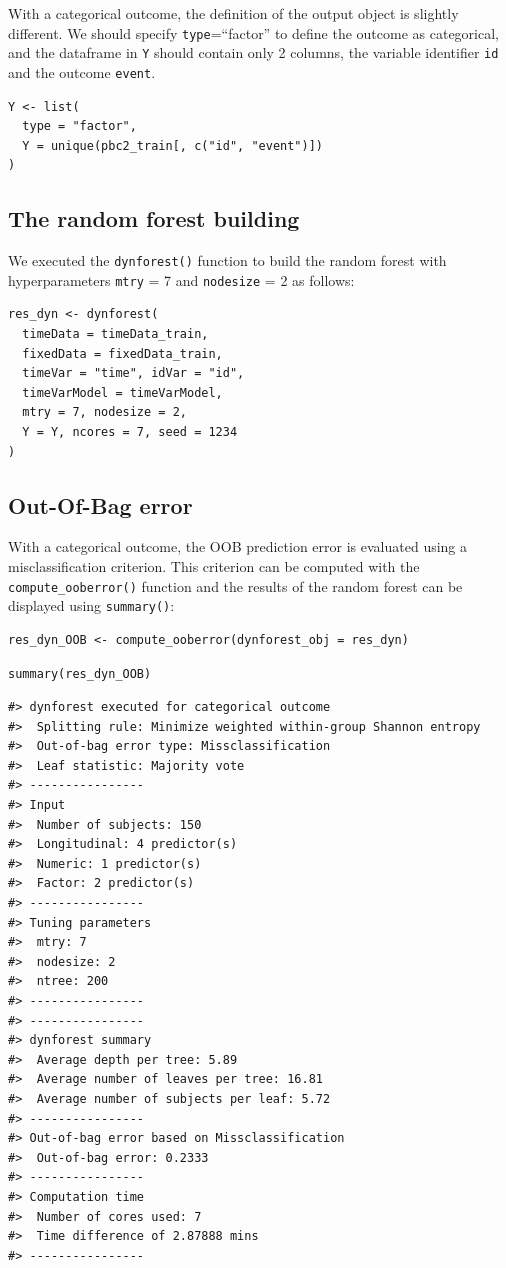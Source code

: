 With a categorical outcome, the definition of the output object is slightly different. We should specify \texttt{type}=``factor'' to define the outcome as categorical, and the dataframe in \texttt{Y} should contain only 2 columns, the variable identifier \texttt{id} and the outcome \texttt{event}.

\begin{verbatim}
Y <- list(
  type = "factor",
  Y = unique(pbc2_train[, c("id", "event")])
)
\end{verbatim}

\subsection{The random forest building}\label{the-random-forest-building}

We executed the \texttt{dynforest()} function to build the random forest with hyperparameters \texttt{mtry} = 7 and \texttt{nodesize} = 2 as follows:

\begin{verbatim}
res_dyn <- dynforest(
  timeData = timeData_train,
  fixedData = fixedData_train,
  timeVar = "time", idVar = "id",
  timeVarModel = timeVarModel,
  mtry = 7, nodesize = 2,
  Y = Y, ncores = 7, seed = 1234
)
\end{verbatim}

\subsection{Out-Of-Bag error}\label{out-of-bag-error-1}

With a categorical outcome, the OOB prediction error is evaluated using a misclassification criterion. This criterion can be computed with the \texttt{compute\_ooberror()} function and the results of the random forest can be displayed using \texttt{summary()}:

\begin{verbatim}
res_dyn_OOB <- compute_ooberror(dynforest_obj = res_dyn)
\end{verbatim}

\begin{verbatim}
summary(res_dyn_OOB)
\end{verbatim}

\begin{verbatim}
#> dynforest executed for categorical outcome 
#>  Splitting rule: Minimize weighted within-group Shannon entropy 
#>  Out-of-bag error type: Missclassification 
#>  Leaf statistic: Majority vote 
#> ---------------- 
#> Input 
#>  Number of subjects: 150 
#>  Longitudinal: 4 predictor(s) 
#>  Numeric: 1 predictor(s) 
#>  Factor: 2 predictor(s) 
#> ---------------- 
#> Tuning parameters 
#>  mtry: 7 
#>  nodesize: 2 
#>  ntree: 200 
#> ---------------- 
#> ---------------- 
#> dynforest summary 
#>  Average depth per tree: 5.89 
#>  Average number of leaves per tree: 16.81 
#>  Average number of subjects per leaf: 5.72 
#> ---------------- 
#> Out-of-bag error based on Missclassification 
#>  Out-of-bag error: 0.2333 
#> ---------------- 
#> Computation time 
#>  Number of cores used: 7 
#>  Time difference of 2.87888 mins
#> ----------------
\end{verbatim}

